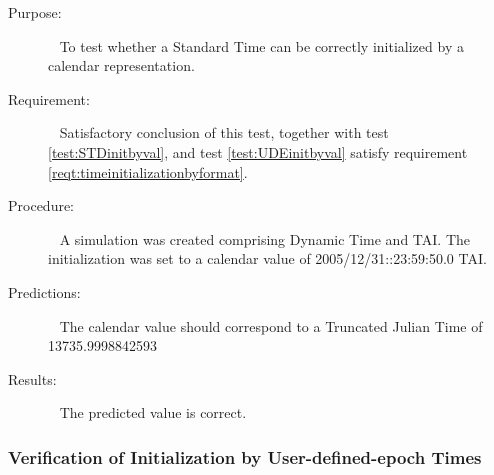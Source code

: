   \label{test:STDinitbycal}
\begin{description}
\item[Purpose:]\ \newline
To test whether a Standard Time can be correctly initialized by a calendar representation.

\item[Requirement:]\ \newline
Satisfactory conclusion of this test, together with test \ref{test:STDinitbyval}, and test \ref{test:UDEinitbyval} satisfy requirement \ref{reqt:timeinitializationbyformat}.


\item[Procedure:]\ \newline
A simulation was created comprising Dynamic Time and TAI.  The initialization was set to a calendar value of 2005/12/31::23:59:50.0 TAI.

\item[Predictions:]\ \newline
The calendar value should correspond to a Truncated Julian Time of 13735.9998842593

\item[Results:]\ \newline
The predicted value is correct.

\end{description}



\subsubsection{Verification of Initialization by User-defined-epoch Times}



